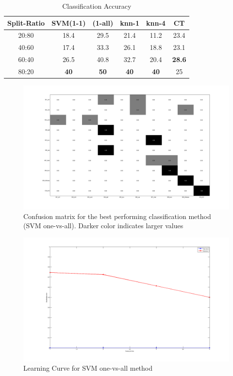 \documentclass[10pt,twocolumn,letterpaper]{article}
\begin{document}
\begin{table}[ht] 
\caption{Classification Accuracy} %
\centering %
\begin{tabular}{c c c c c c} %
\hline\hline %
Split-Ratio  & SVM(1-1) & (1-all) & knn-1 & knn-4 & CT\\ [0.5ex] %
\hline %
20:80 &	18.4	 & 29.5  & 21.4 & 11.2 & 23.4 \\
40:60 &	17.4 &	33.3 & 26.1	& 18.8 &	 23.1 \\
60:40 &	26.5	 & 40.8	 & 32.7	& 20.4 &	 \textbf{28.6} \\
80:20 &	\textbf{40}   &	\textbf{50}	 & \textbf{40}	& \textbf{40}	   & 25 \\  [1ex]
\hline %
\end{tabular} 
\label{table:acc} %
\end{table} 

\begin{figure}[ht]
\includegraphics[scale=0.18]{conf_svm_ovr.png}
\caption{Confusion matrix for the best performing classification method (SVM one-vs-all). Darker color indicates larger values}
\label{Fig:conf_mat}
\end{figure}

\begin{figure}[ht]
\includegraphics[scale=0.1]{svm_ovr_lc.png}
\caption{Learning Curve for SVM one-vs-all method}

\label{Fig:lc}
\end{figure}
\end{document}
